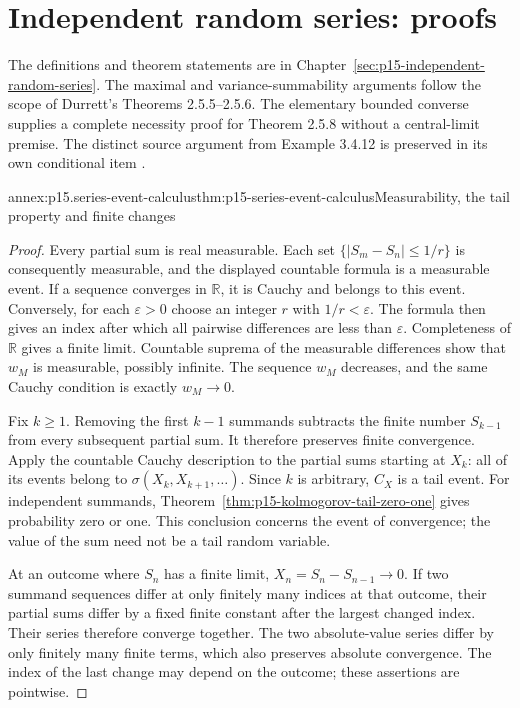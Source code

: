 \section{Independent random series: proofs}
\label{sec:annex-p15-independent-random-series}

The definitions and theorem statements are in
Chapter~\ref{sec:p15-independent-random-series}. The maximal and
variance-summability arguments follow the scope of Durrett's
Theorems 2.5.5--2.5.6. The elementary bounded converse supplies a
complete necessity proof for Theorem 2.5.8 without a central-limit
premise. The distinct source argument from Example 3.4.12 is preserved
in its own conditional item
\cite[pp.~84--85, 148--151]{DurrettPTEAuthor2019}.

\begin{annexitem}{annex:p15.series-event-calculus}{thm:p15-series-event-calculus}{Measurability, the tail property and finite changes}
\begin{proof}
Every partial sum is real measurable. Each set
\(\{|S_m-S_n|\leq1/r\}\) is consequently measurable, and the
displayed countable formula is a measurable event. If a sequence
converges in \(\mathbb R\), it is Cauchy and belongs to this event.
Conversely, for each \(\varepsilon>0\) choose an integer \(r\)
with \(1/r<\varepsilon\). The formula then gives an index after
which all pairwise differences are less than \(\varepsilon\).
Completeness of \(\mathbb R\) gives a finite limit. Countable
suprema of the measurable differences show that \(w_M\) is
measurable, possibly infinite. The sequence \(w_M\) decreases,
and the same Cauchy condition is exactly \(w_M\to0\).

Fix \(k\geq1\). Removing the first \(k-1\) summands subtracts
the finite number \(S_{k-1}\) from every subsequent partial sum.
It therefore preserves finite convergence. Apply the countable Cauchy
description to the partial sums starting at \(X_k\): all of its
events belong to \(\sigma(X_k,X_{k+1},\ldots)\). Since \(k\)
is arbitrary, \(C_X\) is a tail event. For independent summands,
Theorem~\ref{thm:p15-kolmogorov-tail-zero-one} gives probability
zero or one. This conclusion concerns the event of convergence; the
value of the sum need not be a tail random variable.

At an outcome where \(S_n\) has a finite limit,
\(X_n=S_n-S_{n-1}\to0\). If two summand sequences differ at only
finitely many indices at that outcome, their partial sums differ by
a fixed finite constant after the largest changed index. Their series
therefore converge together. The two absolute-value series differ by
only finitely many finite terms, which also preserves absolute
convergence. The index of the last change may depend on the outcome;
these assertions are pointwise.
\end{proof}
\end{annexitem}

